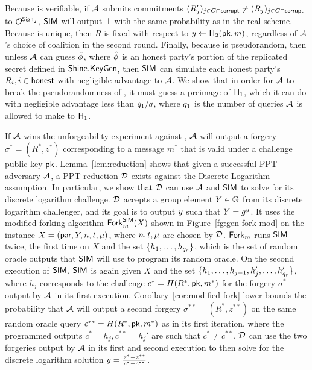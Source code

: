 Because \DVRFOne is verifiable,
if $\mathcal{A}$ submits commitments $(R_j')_{j \in C \cap \mathsf{corrupt}} \ne (R_j)_{j \in C \cap \mathsf{corrupt}}$
to $\mathcal{O}^{\mathsf{Sign}_2}$,
$\mathsf{SIM}$ will output $\bot$ with the same probability as in the real scheme.
Because \DVRFOne is unique,
then $R$ is fixed with respect to $y \gets \mathsf{H}_2(\mathsf{pk}, m)$,
regardless of $\mathcal{A}$'s choice of coalition in the second round.
Finally,
because \DVRFOne is pseudorandom,
then unless $\mathcal{A}$ can guess $\hat{\phi}$,
where $\hat{\phi}$ is an honest party's portion of the replicated secret defined in $\mathsf{Shine}.\mathsf{KeyGen}$,
then $\mathsf{SIM}$ can simulate each honest party's $R_i, i \in \mathsf{honest}$ with negligible advantage to $\mathcal{A}$.
We show that in order for $\mathcal{A}$ to break the pseudorandomness of \DVRFOne,
it must guess a preimage of $\mathsf{H}_1$,
which it can do with negligible advantage less than $q_1/q$,
where $q_1$ is the number of queries $\mathcal{A}$ is allowed to make to $\mathsf{H}_1$.

If $\mathcal{A}$ wins the unforgeability experiment against \glitter,
$\mathcal{A}$ will output a forgery $\sigma^* = (R^*, z^*)$ corresponding to a message $m^*$ that is valid under a challenge public key $\mathsf{pk}$.
Lemma~\ref{lem:reduction} shows that given a successful PPT adversary $\mathcal{A}$,
a PPT reduction $\mathcal{D}$ exists against the Discrete Logarithm assumption.
In particular, we show that $\mathcal{D}$ can use $\mathcal{A}$ and $\mathsf{SIM}$ to solve for its discrete logarithm challenge.
$\mathcal{D}$ accepts a group element $Y \in \mathbb{G}$ from its discrete logarithm
challenger,
and its goal is to output $y$ such that $Y = g^{y}$.
It uses the modified forking algorithm $\mathsf{Fork}_m^{\mathsf{SIM}}(X)$ shown in Figure~\ref{fg:gen-fork-mod}
on the instance $X = (\mathsf{par}, Y, n, t, \mu)$,
where $n, t, \mu$ are chosen by $\mathcal{D}$.
$\mathsf{Fork}_m$ runs $\mathsf{SIM}$ twice,
the first time on $X$ and the set $\{ h_1, \ldots, h_{q_r} \}$,
which is the set of random oracle outputs that $\mathsf{SIM}$ will use to program its random oracle.
On the second execution of $\mathsf{SIM}$,
$\mathsf{SIM}$ is again given $X$ and the set $\{ h_1, \ldots, h_{j-1}, h_{j}', \ldots,  h_{q_r}'\}$,
where $h_j$ corresponds to the challenge $c^* = H(R^*, \mathsf{pk}, m^*)$ for the forgery $\sigma^*$ output by $\mathcal{A}$ in its first execution.
Corollary~\ref{cor:modified-fork} lower-bounds the probability that $\mathcal{A}$ will output a second forgery $\sigma^{**} = (R^*, z^{**})$ on the same random oracle query
$c^{**} = H(R^*, \mathsf{pk}, m^*)$ as in its first iteration,
where the programmed outputs $c^* = h_j, c^{**} = h_j'$ are such that $c^* \neq c^{**}$.
$\mathcal{D}$ can use the two forgeries output by $\mathcal{A}$ in its first and second execution to then solve for the discrete logarithm solution $y =
\frac{z^* - z^{**}}{c^* - c^{**}}$.


